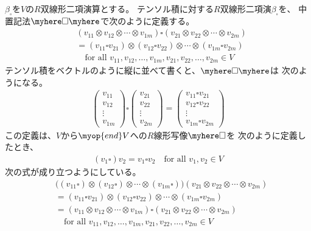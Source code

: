 	$\beta_\square$を$V$の$R$双線形二項演算とする。
	テンソル積に対する$R$双線形二項演$\beta_\square$を、
	中置記法$\myhere\square\myhere$で次のように定義する。
	\begin{equation}\begin{split} %
		&(v_{11}\otimes v_{12}\otimes\cdots\otimes v_{1m})
			\square(v_{21}\otimes v_{22}\otimes\cdots\otimes v_{2m}) \\
		&= (v_{11}\square v_{21})\otimes (v_{12}\square v_{22})\otimes\cdots
			\otimes (v_{1m}\square v_{2m}) \\
		&\quad\text{for all }v_{11},v_{12},\dots,v_{1m},v_{21},v_{22},\dots
			,v_{2m}\in V
	\end{split}\end{equation} %
	テンソル積をベクトルのように縦に並べて書くと、$\myhere\square\myhere$は
	次のようになる。
	\begin{equation*}\begin{split} %
		\begin{pmatrix}
			v_{11}\\ v_{12}\\ \vdots\\ v_{1m}
		\end{pmatrix}\square \begin{pmatrix}
			v_{21}\\ v_{22}\\ \vdots\\ v_{2m}
		\end{pmatrix} = \begin{pmatrix}
			v_{11}\square v_{21}\\ v_{12}\square v_{22}\\
			\vdots\\ v_{1m}\square v_{2m}
		\end{pmatrix}
	\end{split}\end{equation*} %
	この定義は、$V$から$\myop{end}V$への$R$線形写像$\myhere\square$を
	次のように定義したとき、
	\begin{equation*}\begin{split} %
		(v_1\square)v_2 = v_1\square v_2 \quad\text{for all } v_1,v_2\in V
	\end{split}\end{equation*} %
	次の式が成り立つようにしている。
	\begin{equation}\begin{split} %
		&\bigl((v_{11}\square)\otimes(v_{12}\square)\otimes\cdots
			\otimes(v_{1m}\square)\bigr)
			(v_{21}\otimes v_{22}\otimes\cdots\otimes v_{2m}) \\
		&= (v_{11}\square v_{21})\otimes (v_{12}\square v_{22})\otimes\cdots
			\otimes (v_{1m}\square v_{2m}) \\
		&=(v_{11}\otimes v_{12}\otimes\cdots\otimes v_{1m})
			\square(v_{21}\otimes v_{22}\otimes\cdots\otimes v_{2m}) \\
		&\quad\text{for all }v_{11},v_{12},\dots,v_{1m},v_{21},v_{22},\dots
			,v_{2m}\in V
	\end{split}\end{equation} %


